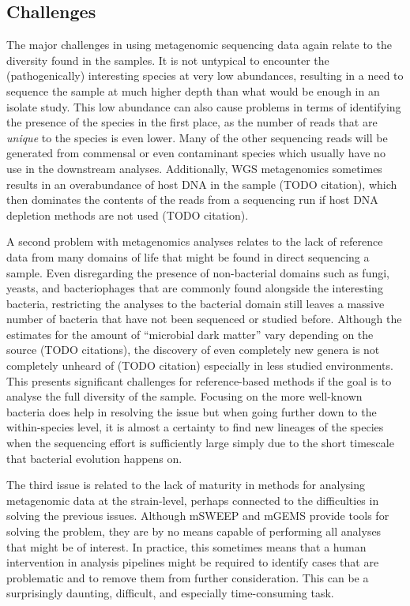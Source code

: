 \documentclass[officiallayout]{tktla}
\begin{document}
\subsection{Challenges}
The major challenges in using metagenomic sequencing data again relate
to the diversity found in the samples. It is not untypical to
encounter the (pathogenically) interesting species at very low
abundances, resulting in a need to sequence the sample at much higher
depth than what would be enough in an isolate study. This low
abundance can also cause problems in terms of identifying the presence
of the species in the first place, as the number of reads that are
\textit{unique} to the species is even lower. Many of the other
sequencing reads will be generated from commensal or even contaminant
species which usually have no use in the downstream
analyses. Additionally, WGS metagenomics sometimes results in an
overabundance of host DNA in the sample (TODO citation), which then
dominates the contents of the reads from a sequencing run if host DNA
depletion methods are not used (TODO citation).

A second problem with metagenomics analyses relates to the lack of
reference data from many domains of life that might be found in direct
sequencing a sample. Even disregarding the presence of non-bacterial
domains such as fungi, yeasts, and bacteriophages that are commonly
found alongside the interesting bacteria, restricting the analyses to
the bacterial domain still leaves a massive number of bacteria that
have not been sequenced or studied before. Although the estimates for
the amount of ``microbial dark matter'' vary depending on the source
(TODO citations), the discovery of even completely new genera is not
completely unheard of (TODO citation) especially in less studied
environments. This presents significant challenges for reference-based
methods if the goal is to analyse the full diversity of the
sample. Focusing on the more well-known bacteria does help in
resolving the issue but when going further down to the within-species
level, it is almost a certainty to find new lineages of the species
when the sequencing effort is sufficiently large simply due to the
short timescale that bacterial evolution happens on.

The third issue is related to the lack of maturity in methods for
analysing metagenomic data at the strain-level, perhaps connected to
the difficulties in solving the previous issues. Although mSWEEP and
mGEMS provide tools for solving the problem, they are by no means
capable of performing all analyses that might be of interest. In
practice, this sometimes means that a human intervention in analysis
pipelines might be required to identify cases that are problematic and
to remove them from further consideration. This can be a surprisingly
daunting, difficult, and especially time-consuming task.
\end{document}
